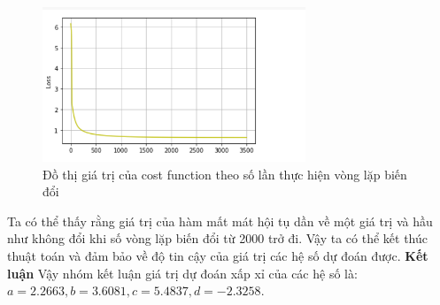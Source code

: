 \begin{figure}[H]
    \centering
    \includegraphics[width=0.7\textwidth]{image/bt5/Loss Func plot.png}
    \caption{Đồ thị giá trị của cost function theo số lần thực hiện vòng lặp biến đổi}
\end{figure}
Ta có thể thấy rằng giá trị của hàm mất mát hội tụ dần về một giá trị và hầu như không đổi khi số vòng lặp biến đổi từ 2000 trở đi. Vậy ta có thể kết thúc thuật toán và đảm bảo về độ tin cậy của giá trị các hệ số dự đoán được.
\newline
\newline
{\large\textbf{Kết luận}}
\newline
Vậy nhóm kết luận giá trị dự đoán xấp xỉ của các hệ số là: $a = 2.2663, b = 3.6081, c = 5.4837, d = -2.3258$. \\
\\



      



























